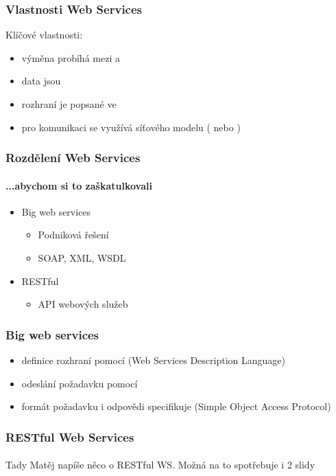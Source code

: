 \documentclass[12pt]{beamer}
\begin{document}
\begin{frame}
  \frametitle{Vlastnosti Web Services}

  \begin{block}{Klíčové vlastnosti:}
    \begin{itemize}
      \item výměna probíhá mezi  a 
      \item data jsou 
      \item rozhraní je popsané ve 
      \item pro komunikaci se využívá  síťového modelu ( nebo )
    \end{itemize}
  \end{block}
\end{frame}

\begin{frame}
  \frametitle{Rozdělení Web Services}
  \framesubtitle{...abychom si to zaškatulkovali}
	\begin{itemize}
      \item \LARGE Big web services
		\begin{itemize}
			\item Podniková řešení
			\item SOAP, XML, WSDL
		\end{itemize}
      \item \LARGE RESTful
		\begin{itemize}
			\item API webových služeb
		\end{itemize}
    \end{itemize}
\end{frame}

\begin{frame}
	\frametitle{Big web services}
	\begin{itemize}
		\item definice rozhraní pomocí  (Web Services Description Language)
		\item odeslání požadavku pomocí 
		\item formát požadavku i odpovědi specifikuje  (Simple Object Access Protocol)
	\end{itemize}
\end{frame}

\begin{frame}
  \frametitle{RESTful Web Services}
  \framesubtitle{}

  Tady Matěj napíše něco o RESTful WS. Možná na to spotřebuje i 2 slidy
\end{frame}
\end{document}
